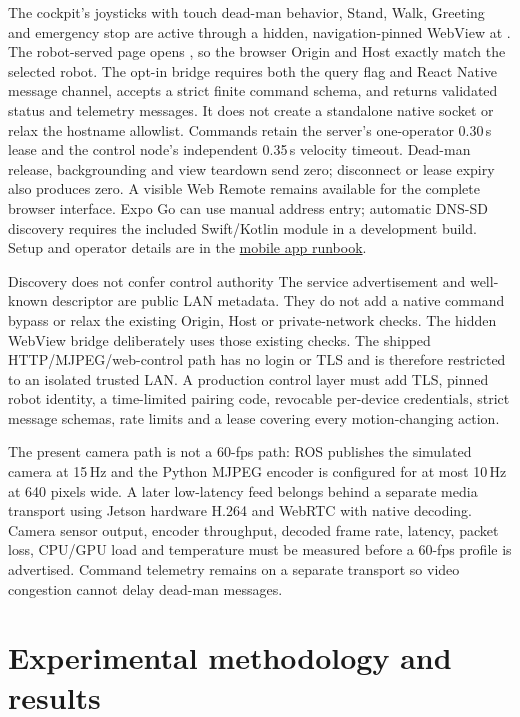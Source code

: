 \documentclass[11pt,a4paper]{article}
\begin{document}
The cockpit's joysticks with touch dead-man behavior, Stand, Walk, Greeting and
emergency stop are active through a hidden, navigation-pinned WebView at
. The robot-served page opens , so
the browser Origin and Host exactly match the selected robot. The opt-in bridge
requires both the query flag and React Native message channel, accepts a strict
finite command schema, and returns validated status and telemetry messages. It
does not create a standalone native socket or relax the hostname allowlist.
Commands retain the server's one-operator 0.30\,s lease and the control node's
independent 0.35\,s velocity timeout. Dead-man release, backgrounding and view
teardown send zero; disconnect or lease expiry also produces zero. A visible
Web Remote remains available for the complete browser interface. Expo Go can
use manual address entry; automatic DNS-SD discovery requires the included
Swift/Kotlin module in a development build. Setup and operator details are in the
\href{mobile_app.md}{mobile app runbook}.

\begin{decision}{Discovery does not confer control authority}
The service advertisement and well-known descriptor are public LAN metadata.
They do not add a native command bypass or relax the existing 
Origin, Host or private-network checks. The hidden WebView bridge deliberately
uses those existing checks. The shipped HTTP/MJPEG/web-control path has no
login or TLS and is therefore restricted to an isolated trusted LAN. A
production control layer must add TLS, pinned robot identity, a time-limited
pairing code, revocable per-device credentials, strict message schemas, rate
limits and a lease covering every motion-changing action.
\end{decision}

The present camera path is not a 60-fps path: ROS publishes the simulated
camera at 15\,Hz and the Python MJPEG encoder is configured for at most 10\,Hz
at 640 pixels wide. A later low-latency feed belongs behind a separate media
transport using Jetson hardware H.264 and WebRTC with native decoding. Camera
sensor output, encoder throughput, decoded frame rate, latency, packet loss,
CPU/GPU load and temperature must be measured before a 60-fps profile is
advertised. Command telemetry remains on a separate transport so video
congestion cannot delay dead-man messages.

\section{Experimental methodology and results}
\end{document}
